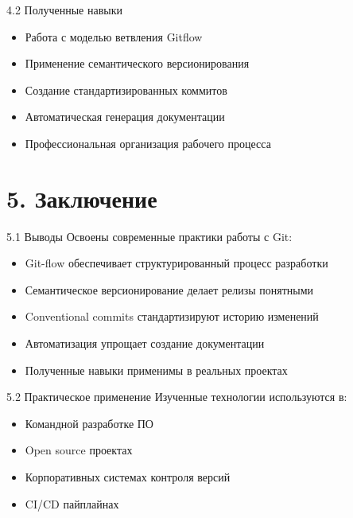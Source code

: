 \documentclass[
  ignorenonframetext,
  aspectratio=169,
  russian,
]{beamer}
\providecommand{\tightlist}{%
  \setlength{\itemsep}{0pt}\setlength{\parskip}{0pt}}
\begin{document}
\begin{frame}{4.2 Полученные навыки}
\label{ux43fux43eux43bux443ux447ux435ux43dux43dux44bux435-ux43dux430ux432ux44bux43aux438}
\begin{itemize}[<+->]
\tightlist
\item
  Работа с моделью ветвления Gitflow
\item
  Применение семантического версионирования
\item
  Создание стандартизированных коммитов
\item
  Автоматическая генерация документации
\item
  Профессиональная организация рабочего процесса
\end{itemize}
\end{frame}

\section{5. Заключение}\label{ux437ux430ux43aux43bux44eux447ux435ux43dux438ux435}

\begin{frame}{5.1 Выводы}
\label{ux432ux44bux432ux43eux434ux44b}
Освоены современные практики работы с Git:

\begin{itemize}[<+->]
\tightlist
\item
  Git-flow обеспечивает структурированный процесс разработки
\item
  Семантическое версионирование делает релизы понятными
\item
  Conventional commits стандартизируют историю изменений
\item
  Автоматизация упрощает создание документации
\item
  Полученные навыки применимы в реальных проектах
\end{itemize}
\end{frame}

\begin{frame}{5.2 Практическое применение}
\label{ux43fux440ux430ux43aux442ux438ux447ux435ux441ux43aux43eux435-ux43fux440ux438ux43cux435ux43dux435ux43dux438ux435}
Изученные технологии используются в:

\begin{itemize}[<+->]
\tightlist
\item
  Командной разработке ПО
\item
  Open source проектах
\item
  Корпоративных системах контроля версий
\item
  CI/CD пайплайнах
\end{itemize}
\end{frame}
\end{document}
